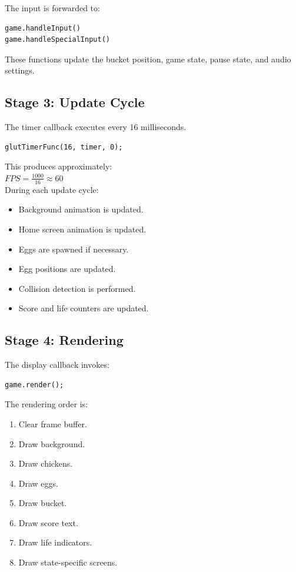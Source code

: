 \documentclass[12pt,a4paper]{report}
\begin{document}
The input is forwarded to:

\begin{verbatim}
game.handleInput()
game.handleSpecialInput()
\end{verbatim}

These functions update the bucket position, game state, pause state, and audio settings.

\subsection*{Stage 3: Update Cycle}

The timer callback executes every 16 milliseconds.

\begin{verbatim}
glutTimerFunc(16, timer, 0);
\end{verbatim}

This produces approximately:\\


$FPS = \frac{1000}{16}
\approx 60$\\


During each update cycle:

\begin{itemize}
\item Background animation is updated.
\item Home screen animation is updated.
\item Eggs are spawned if necessary.
\item Egg positions are updated.
\item Collision detection is performed.
\item Score and life counters are updated.
\end{itemize}

\subsection*{Stage 4: Rendering}

The display callback invokes:

\begin{verbatim}
game.render();
\end{verbatim}

The rendering order is:

\begin{enumerate}
\item Clear frame buffer.
\item Draw background.
\item Draw chickens.
\item Draw eggs.
\item Draw bucket.
\item Draw score text.
\item Draw life indicators.
\item Draw state-specific screens.
\end{enumerate}
\end{document}
